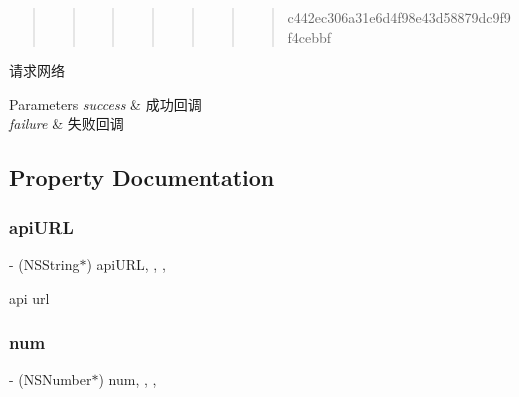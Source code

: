 \begin{quote}
\begin{quote}
\begin{quote}
\begin{quote}
\begin{quote}
\begin{quote}
\begin{quote}
c442ec306a31e6d4f98e43d58879dc9f9f4cebbf \end{quote}
\end{quote}
\end{quote}
\end{quote}
\end{quote}
\end{quote}
\end{quote}
请求网络


\begin{DoxyParams}{Parameters}
{\em success} & 成功回调 \\
\hline
{\em failure} & 失败回调 \\
\hline
\end{DoxyParams}


\subsection{Property Documentation}
\mbox{\label{interface_f_n_a_p_i_public_tool_a9dfd166fa4a711f412d7aa913605bced}} 
\subsubsection{\texorpdfstring{api\+U\+RL}{apiURL}}
{\footnotesize\ttfamily -\/ (N\+S\+String$\ast$) api\+U\+RL\hspace{0.3cm}{\ttfamily [read]}, {\ttfamily [write]}, {\ttfamily [nonatomic]}, {\ttfamily [copy]}}

api url \mbox{\label{interface_f_n_a_p_i_public_tool_ab7800f575488a97ea7762893ace23088}} 
\subsubsection{\texorpdfstring{num}{num}}
{\footnotesize\ttfamily -\/ (N\+S\+Number$\ast$) num\hspace{0.3cm}{\ttfamily [read]}, {\ttfamily [write]}, {\ttfamily [nonatomic]}, {\ttfamily [strong]}}

